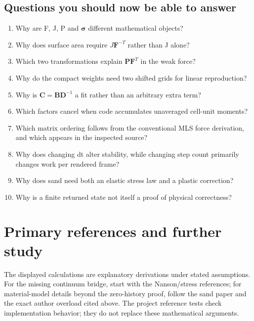 \documentclass[11pt,a4paper]{article}
\newcommand{\mat}[1]{\mathbf{#1}}
\numberwithin{equation}{section}
\begin{document}
\subsection{Questions you should now be able to answer}
\begin{enumerate}
\item Why are F, J, P and $\boldsymbol\sigma$ different mathematical objects?
\item Why does surface area require $J\mat F^{-T}$ rather than J alone?
\item Which two transformations explain $\mat P\mat F^T$ in the weak force?
\item Why do the compact weights need two shifted grids for linear reproduction?
\item Why is $\mat C=\mat B\mat D^{-1}$ a fit rather than an arbitrary extra term?
\item Which factors cancel when code accumulates unaveraged cell-unit moments?
\item Which matrix ordering follows from the conventional MLS force derivation,
      and which appears in the inspected source?
\item Why does changing dt alter stability, while changing step count primarily
      changes work per rendered frame?
\item Why does sand need both an elastic stress law and a plastic correction?
\item Why is a finite returned state not itself a proof of physical correctness?
\end{enumerate}

\section{Primary references and further study}
The displayed calculations are explanatory derivations under stated assumptions.
For the missing continuum bridge, start with the Nanson/stress references; for
material-model details beyond the zero-history proof, follow the sand paper
and the exact author overload cited above. The project reference tests check
implementation behavior; they do not replace these mathematical arguments.
\end{document}
